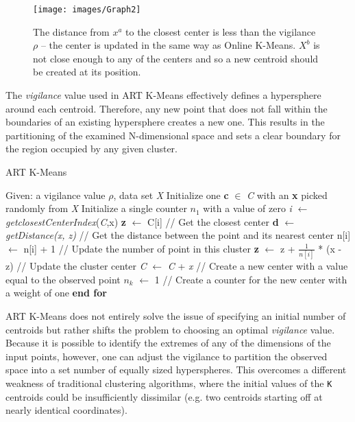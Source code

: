 \documentclass{l4proj}
\begin{document}
\begin{figure}[H]
	\centering
    \label{artGraph}
    \texttt{[image: images/Graph2]}
    \caption{The distance from $x^a$ to the closest center is less than the vigilance $\rho$ -- the center is updated in the same way as Online K-Means. $X^b$ is not close enough to any of the centers and so a new centroid should be created at its position.} 
\end{figure}

The \textit{vigilance} value used in ART K-Means effectively defines a hypersphere around each centroid. Therefore, any new point that does not fall within the boundaries of an existing hypersphere creates a new one. This results in the partitioning of the examined N-dimensional space and sets a clear boundary for the region occupied by any given cluster. 

\begin{algorithm}[H]
\caption{ART K-Means}\label{art-alg}
\begin{algorithmic}[1]
\State Given: a vigilance value $\rho$, data set \textit{X}
\State Initialize one \textbf{c} $\in$ \textit{C} with an \textbf{x} picked randomly from \textit{X}
\State Initialize a single counter $n_{1}$ with a value of zero
    \State \textit{i}  $\gets$ \textit{getclosestCenterIndex}(\textit{C},x)
    \State \textbf{z}  $\gets$ C[i] \hspace{2.35cm} // Get the closest center
    \State \textbf{d} $\gets$ \textit{getDistance(x, z)} \hspace{0.3cm} // Get the distance between the point and its nearest center
        \State n[i] $\gets$ n[i] + 1 \hspace{1.3cm} // Update the number of point in this cluster
        \State \textbf{z} $\gets$ z + $\frac{1}{n[i]}$ * (x - z) \hspace{0.35cm} // Update the cluster center
    \Else
        \State \textit{C} $\gets$ \textit{C} + \textit{x} \hspace{0.55cm} // Create a new center with a value equal to the observed point
        \State $n_k$ $\gets$ 1 \hspace{1cm} // Create a counter for the new center with a weight of one
    \EndIf
\EndFor
\State \textbf{end for}
\end{algorithmic}
\end{algorithm}

ART K-Means does not entirely solve the issue of specifying an initial number of centroids but rather shifts the problem to choosing an optimal \textit{vigilance} value. Because it is possible to identify the extremes of any of the dimensions of the input points, however, one can adjust the vigilance to partition the observed space into a set number of equally sized hyperspheres. This overcomes a different weakness of traditional clustering algorithms, where the initial values of the \texttt{K} centroids could be insufficiently dissimilar (e.g. two centroids starting off at nearly identical coordinates).
\end{document}
